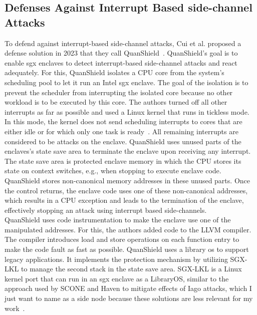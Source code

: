 \subsection{Defenses Against Interrupt Based side-channel Attacks}
\label{sec:20:mitigations:interrupt_sca}
To defend against interrupt-based side-channel attacks, Cui et al. proposed a
defense solution in 2023 that they call QuanShield~\cite{cui_quanshield_2023}.
QuanShield's goal is to enable \gls{sgx} enclaves to detect interrupt-based
side-channel attacks and react adequately. For this, QuanShield isolates a CPU
core from the system's scheduling pool to let it run an Intel \gls{sgx} enclave.
The goal of the isolation is to prevent the scheduler from interrupting the
isolated core because no other workload is to be executed by this core. The
authors turned off all other interrupts as far as possible and used a Linux
kernel that runs in tickless mode. In this mode, the kernel does not send
scheduling interrupts to cores that are either idle or for which only one task
is ready~\cite{linuxtickless}. All remaining interrupts are considered to be
attacks on the enclave. QuanShield uses unused parts of the enclaves's state
save area to terminate the enclave upon receiving any interrupt. The state save
area is protected enclave memory in which the CPU stores its state on context
switches, e.g., when stopping to execute enclave code. QuanShield stores
non-canonical memory addresses in these unused parts. Once the control returns,
the enclave code uses one of these non-canonical addresses, which results in a
CPU exception and leads to the termination of the enclave, effectively stopping
an attack using interrupt based side-channels.\\

QuanShield uses code instrumentation to make the enclave use one of the
manipulated addresses. For this, the authors added code to the LLVM compiler.
The compiler introduces load and store operations on each function entry to make
the code fault as fast as possible. QuanShield uses a library \gls{os} to
support legacy applications. It implements the protection mechanism by utilizing
SGX-LKL to manage the second stack in the state save area. SGX-LKL is a Linux
kernel port that can run in an \gls{sgx} enclave as a LibraryOS, similar to the
approach used by SCONE and Haven to mitigate effects of Iago attacks, which I
just want to name as a side node because these solutions are less relevant for
my work~\cite{priebe2019sgx,arnautov_scone_2016,baumann_shielding_2015,
checkoway2013iago}.

